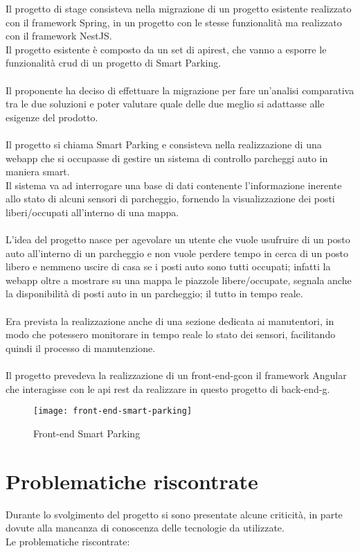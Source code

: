 Il progetto di stage consisteva nella migrazione di un progetto esistente realizzato con il framework
Spring, in un progetto con le stesse funzionalità ma realizzato con il framework NestJS.
\\
Il progetto esistente è composto da un set di
\gls{api}\glsfirstoccur \gls{rest}\glsfirstoccur, che vanno a esporre le funzionalità \gls{crud}
di un progetto di Smart Parking. 
\\\\
Il proponente ha deciso di effettuare 
la migrazione per fare un'analisi comparativa tra le due soluzioni
e poter valutare quale delle due meglio si adattasse alle esigenze
del prodotto.
\\\\
Il progetto si chiama Smart Parking e consisteva nella realizzazione di una webapp che si occupasse di gestire un sistema
di controllo parcheggi auto in maniera smart. 
\\
Il sistema va ad interrogare una base di dati contenente
l'informazione inerente allo stato di alcuni sensori di parcheggio, fornendo la visualizzazione
dei posti liberi/occupati all'interno di una mappa.
\\\\
L'idea del progetto nasce per agevolare un utente che vuole usufruire di un posto auto all'interno di 
un parcheggio e non vuole perdere tempo in cerca di un posto libero e nemmeno uscire di casa se i posti auto
sono tutti occupati; infatti la webapp oltre a mostrare su una mappa le piazzole libere/occupate, segnala 
anche la disponibilità di posti auto in un parcheggio; il tutto in tempo reale.
\\\\
Era prevista la realizzazione anche di una sezione dedicata ai manutentori, in modo che potessero monitorare
in tempo reale lo stato dei sensori, facilitando quindi il processo di manutenzione.
\\\\
Il progetto prevedeva la realizzazione di un \gls{front-end-g}\glsfirstoccur con il framework Angular che interagisse 
con le \gls{api} \gls{rest} da realizzare in questo progetto di 
\gls{back-end-g}\glsfirstoccur.
\clearpage
\begin{figure}[H]
    \centering
    \texttt{[image: front-end-smart-parking]}
    \caption{Front-end Smart Parking}
\end{figure}

\section{Problematiche riscontrate}
Durante lo svolgimento del progetto si sono presentate alcune criticità, in parte dovute alla mancanza
di conoscenza delle tecnologie da utilizzate. 
\\
Le problematiche riscontrate:


